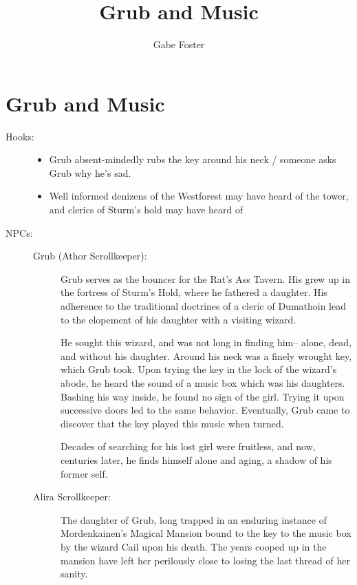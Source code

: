 \documentclass[11pt]{article}
\theoremstyle{definition}
\theoremstyle{remark}
\begin{document}
	\title{Grub and Music}
	\date{\vspace{-24pt}}
	\author{Gabe Foster}
	\maketitle

\section{Grub and Music}

\begin{description}

\item[Hooks:] 

\begin{itemize}

\item{Grub absent-mindedly rubs the key around his neck / someone asks Grub why he's sad.}

\item{Well informed denizens of the Westforest may have heard of the tower, and clerics of Sturm's hold may have heard of}

\end{itemize}

\item[NPCs:]
\begin{description}

\item[Grub (Athor Scrollkeeper):] Grub serves as the bouncer for the Rat's Ass Tavern. His grew up in the fortress of Sturm's Hold, where he fathered a daughter. His adherence to the traditional doctrines of a cleric of Dumathoin lead to the elopement of his daughter with a visiting wizard. 

He sought this wizard, and was not long in finding him-- alone, dead, and without his daughter. Around his neck was a finely wrought key, which Grub took. Upon trying the key in the lock of the wizard's abode, he heard the sound of a music box which was his daughters. Bashing his way inside, he found no sign of the girl. Trying it upon successive doors led to the same behavior. Eventually, Grub came to discover that the key played this music when turned. 

Decades of searching for his lost girl were fruitless, and now, centuries later, he finds himself alone and aging, a shadow of his former self.

\item[Alira Scrollkeeper:]
The daughter of Grub, long trapped in an enduring instance of Mordenkainen's Magical Mansion bound to the key to the music box by the wizard Cail upon his death. The years cooped up in the mansion have left her perilously close to losing the last thread of her sanity.


\end{description}
\end{description}
\end{document}
